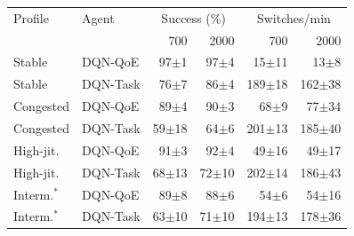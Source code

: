 \begin{tabular}{llrrrr}
\hline
Profile & Agent & \multicolumn{2}{c}{Success (\%)} & \multicolumn{2}{c}{Switches/min} \\
 & & 700 & 2000 & 700 & 2000 \\
\hline
Stable & DQN-QoE & 97$\pm$1 & 97$\pm$4 & 15$\pm$11 & 13$\pm$8 \\
Stable & DQN-Task & 76$\pm$7 & 86$\pm$4 & 189$\pm$18 & 162$\pm$38 \\
Congested & DQN-QoE & 89$\pm$4 & 90$\pm$3 & 68$\pm$9 & 77$\pm$34 \\
Congested & DQN-Task & 59$\pm$18 & 64$\pm$6 & 201$\pm$13 & 185$\pm$40 \\
High-jit. & DQN-QoE & 91$\pm$3 & 92$\pm$4 & 49$\pm$16 & 49$\pm$17 \\
High-jit. & DQN-Task & 68$\pm$13 & 72$\pm$10 & 202$\pm$14 & 186$\pm$43 \\
Interm.$^{*}$ & DQN-QoE & 89$\pm$8 & 88$\pm$6 & 54$\pm$6 & 54$\pm$16 \\
Interm.$^{*}$ & DQN-Task & 63$\pm$10 & 71$\pm$10 & 194$\pm$13 & 178$\pm$36 \\
\hline
\end{tabular}
